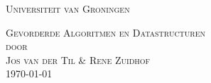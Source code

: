 

\begin{titlepage}

\begin{center}

\Large
\textsc{Universiteit van Groningen}\\

\vspace{5cm}

\textsc{Gevorderde Algoritmen en Datastructuren\\[0.5\baselineskip]
door\\[0.5\baselineskip]
Jos van der Til \& Rene Zuidhof}\\

\vspace{5cm}
\textsc{\today}\\ %

\vspace{1cm}
\end{center}

\end{titlepage}

\tableofcontents %
\cleardoublepage %

\pagestyle{plain} %